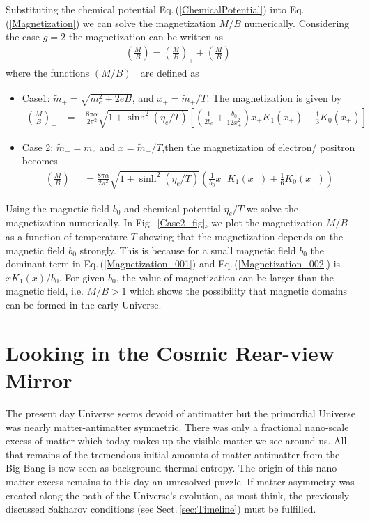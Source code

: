 \documentclass[universe,article,submit,moreauthors,pdftex,a4paper]{Definitions/mdpi}
\newcommand{\req}[1]{Eq.\,(\ref{#1})}
\newcommand*{\rf}[1]{Fig.~{\ref{#1}}}
\newcommand*{\rsec}[1]{Sect.\,{\ref{#1}}}
\begin{document}
Substituting the chemical potential \req{ChemicalPotential} into \req{Magnetization} we can solve the magnetization $M/B$ numerically.
Considering the case $g=2$ the magnetization can be written as 
\begin{align}
\left(\frac{M}{B}\right)=\left(\frac{M}{B}\right)_++\left(\frac{M}{B}\right)_-
\end{align}
where the functions $(M/B)_\pm$ are defined as 
\begin{itemize}
 \item Case1: $\tilde m_+=\sqrt{m^2_e+2eB}$, and $x_+=\tilde m_+/T$. The magnetization is given by
\begin{align}\label{Magnetization_001}
 \left(\frac{M}{B}\right)_+&=-\frac{8\pi\alpha}{2\pi^2}\sqrt{1+\sinh^2(\eta_e/T)}\left[\left(\frac{1}{2b_0}+\frac{b_0}{12x_+^2}\right)x_+K_1(x_+)+\frac{1}{3}K_0(x_+)\right]
\end{align}
 \item Case 2: $\tilde m_-=m_e$ and $x=\tilde m_-/T$,then the magnetization of electron/ positron becomes
\begin{align}\label{Magnetization_002}
\left(\frac{M}{B}\right)_-&=\frac{8\pi\alpha}{2\pi^2}\sqrt{1+\sinh^2(\eta_e/T)}\left(\frac{1}{b_0}x_-K_1(x_-)+\frac{1}{6}K_0(x_-)\right)
\end{align}
\end{itemize}
Using the magnetic field $b_0$ and chemical potential $\eta_e/T$ we solve the magnetization numerically. In \rf{Case2_fig}, we plot the magnetization $M/B$ as a function of temperature $T$ showing that the magnetization depends on the magnetic field $b_0$ strongly. This is because for a small magnetic field $b_0$ the dominant term in \req{Magnetization_001} and \req{Magnetization_002} is $xK_1(x)/b_0$. For given $b_0$, the value of magnetization can be larger than the magnetic field, i.e. $M/B>1$ which shows the possibility that magnetic domains can be formed in the early Universe.


\section{Looking in the Cosmic Rear-view Mirror}\label{Summary}
\noindent The present day Universe seems devoid of antimatter but the primordial Universe was nearly matter-antimatter symmetric. There was only a fractional nano-scale excess of matter which today makes up the visible matter we see around us. All that remains of the tremendous initial amounts of matter-antimatter from the Big Bang is now seen as background thermal entropy. The origin of this nano-matter excess remains to this day an unresolved puzzle. If matter asymmetry was created along the path of the Universe's evolution, as most think, the previously discussed Sakharov conditions (see \rsec{sec:Timeline}) must be fulfilled.
\end{document}
